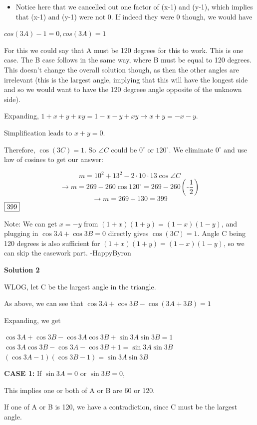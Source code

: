\begin{enumerate}
 
            \begin{itemize}
        \item Notice here that we cancelled out one factor of (x-1) and (y-1), which implies that (x-1) and (y-1) were not 0. If indeed they were 0 though, we would have
            \end{itemize}
            $cos(3A)-1=0, cos(3A)=1$ 

 For this we could say that A must be 120 degrees for this to work. This is one case. The B case follows in the same way, where B must be equal to 120 degrees. This doesn't change the overall solution though, as then the other angles are irrelevant (this is the largest angle, implying that this will have the longest side and so we would want to have the 120 degreee angle opposite of the unknown side).

 Expanding, $1+x+y+xy=1-x-y+xy\rightarrow x+y=-x-y$. 

 Simplification leads to $x+y=0$.

 Therefore, $\cos(3C)=1$. So $\angle C$ could be $0^\circ$ or $120^\circ$. We eliminate $0^\circ$ and use law of cosines to get our answer: 

 
 \[m=10^2+13^2-2\cdot 10\cdot 13\cos\angle C\]
 \[\rightarrow m=269-260\cos 120^\circ=269-260\left(\text{-}\frac{1}{2}\right)\]
 \[\rightarrow m=269+130=399\]
$\framebox{399}$

 
Note: We can get $x=-y$ from $(1+x)(1+y) = (1-x)(1-y)$, and plugging in $\cos{3A}+\cos{3B}=0$ directly gives $\cos(3C)=1$. Angle C being 120 degrees is also sufficient for $(1+x)(1+y) = (1-x)(1-y)$, so we can skip the casework part. -HappyByron

 



\textbf{Solution 2}

WLOG, let C be the largest angle in the triangle.

 As above, we can see that $\cos3A+\cos3B-\cos(3A+3B)=1$

 Expanding, we get

 $\cos3A+\cos3B-\cos3A\cos3B+\sin3A\sin3B=1$
$\cos3A\cos3B-\cos3A-\cos3B+1=\sin3A\sin3B$
$(\cos3A-1)(\cos3B-1)=\sin3A\sin3B$

 \textbf{CASE 1:} If $\sin 3A = 0$ or $\sin 3B = 0$,

 This implies one or both of A or B are 60 or 120.

 If one of A or B is 120, we have a contradiction, since C must be the largest angle.


\end{enumerate}
